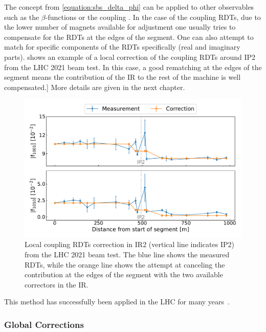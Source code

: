 The concept from \cref{equation:sbs_delta_phi} can be applied to other observables such as the \(\beta\)-functions or the coupling .
In the case of the coupling \glspl{RDT}, due to the lower number of magnets available for adjustment one usually tries to compensate for the \glspl{RDT} at the edges of the segment.
One can also attempt to match for specific components of the \glspl{RDT} specifically (real and imaginary parts).
 shows an example of a local correction of the coupling \glspl{RDT} around IP\num{2} from the LHC \num{2021} beam test.
In this case, a good rematching at the edges of the segment means the contribution of the \gls{IR} to the rest of the machine is well compensated.]
More details are given in the next chapter.

\begin{figure}[!hbt]
  \centering
  \includegraphics*[width=0.99\linewidth]{Figures/Optics_Measurements_Corrections_at_LHC/sbs_coupling_ip2_example.pdf}
  \caption{Local coupling RDTs correction in IR\num{2} (vertical line indicates IP\num{2}) from the LHC \num{2021} beam test. The \textcolor{mplblue}{blue} line shows the measured RDTs, while the \textcolor{mplorange}{orange} line shows the attempt at canceling the contribution at the edges of the segment with the two available correctors in the IR.}
  \label{figure:example_sbs_correction_coupling}
\end{figure}

This method has successfully been applied in the LHC for many years~\cite{PRAB:Aiba:First_Beating_Measurement_LHC,PRAB:Tomas:Record_Low_Beta_Beating_in_the_LHC,PRAB:Persson:LHC_Optics_Commissioning_OnePercent}.

\subsubsection*{Global Corrections}

